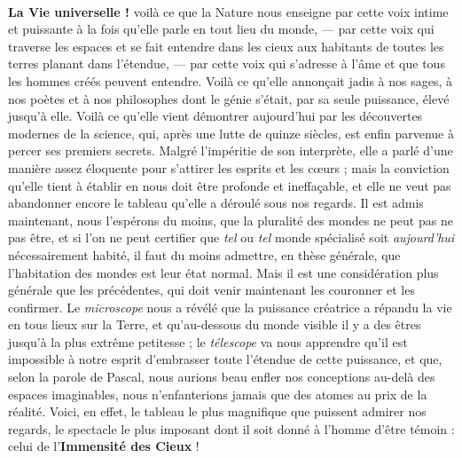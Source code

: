 \documentclass[a4paper, 11pt, oneside, landscape]{article}
\begin{document}
\paragraph{}
\textbf{La Vie universelle !} voilà ce que la Nature nous enseigne par cette voix intime et puissante à la fois qu'elle parle en tout lieu du monde, --- par cette voix qui traverse les espaces et se fait entendre dans les cieux aux habitants de toutes les terres planant dans l'étendue, --- par cette voix qui s'adresse à l'âme et que tous les hommes créés peuvent entendre. Voilà ce qu'elle annonçait jadis à nos sages, à nos poètes et à nos philosophes dont le génie s'était, par sa seule puissance, élevé jusqu'à elle. Voilà ce qu'elle vient démontrer aujourd'hui par les découvertes modernes de la science, qui, après une lutte de quinze siècles, est enfin parvenue à percer ses premiers secrets. Malgré l'impéritie de son interprète, elle a parlé d'une manière assez éloquente pour s'attirer les esprits et les cœurs ; mais la conviction qu'elle tient à établir en nous doit être profonde et ineffaçable, et elle ne veut pas abandonner encore le tableau qu'elle a déroulé sous nos regards. Il est admis maintenant, nous l'espérons du moins, que la pluralité des mondes ne peut pas ne pas être, et si l'on ne peut certifier que \emph{tel} ou \emph{tel} monde spécialisé soit \emph{aujourd'hui} nécessairement habité, il faut du moins admettre, en thèse générale, que l'habitation des mondes est leur état normal. Mais il est une considération plus générale que les précédentes, qui doit venir maintenant les couronner et les confirmer. Le \emph{microscope} nous a révélé que la puissance créatrice a répandu la vie en tous lieux sur la Terre, et qu'au-dessous du monde visible il y a des êtres jusqu'à la plus extrême petitesse ; le \emph{télescope} va nous apprendre qu'il est impossible à notre esprit d'embrasser toute l'étendue de cette puissance, et que, selon la parole de Pascal, nous aurions beau enfler nos conceptions au-delà des espaces imaginables, nous n'enfanterions jamais que des atomes au prix de la réalité. Voici, en effet, le tableau le plus magnifique que puissent admirer nos regards, le spectacle le plus imposant dont il soit donné à l'homme d'être témoin : celui de l'\textbf{Immensité des Cieux} !
\end{document}
